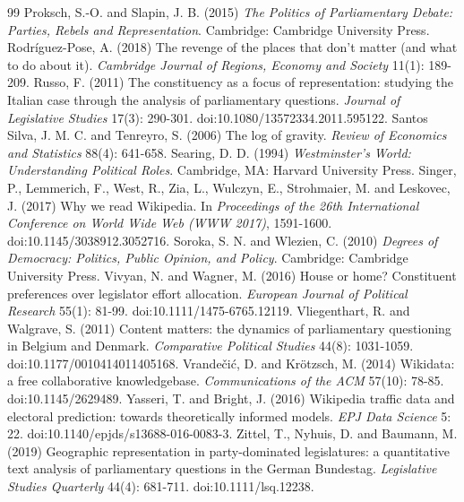 \documentclass[11pt,a4paper]{article}
\begin{document}
\begin{thebibliography}{99}
 Proksch, S.-O. and Slapin, J. B. (2015) \emph{The Politics of Parliamentary Debate: Parties, Rebels and Representation}. Cambridge: Cambridge University Press.
 Rodr\'iguez-Pose, A. (2018) The revenge of the places that don't matter (and what to do about it). \emph{Cambridge Journal of Regions, Economy and Society} 11(1): 189-209.
 Russo, F. (2011) The constituency as a focus of representation: studying the Italian case through the analysis of parliamentary questions. \emph{Journal of Legislative Studies} 17(3): 290-301. doi:10.1080/13572334.2011.595122.
 Santos Silva, J. M. C. and Tenreyro, S. (2006) The log of gravity. \emph{Review of Economics and Statistics} 88(4): 641-658.
 Searing, D. D. (1994) \emph{Westminster's World: Understanding Political Roles}. Cambridge, MA: Harvard University Press.
 Singer, P., Lemmerich, F., West, R., Zia, L., Wulczyn, E., Strohmaier, M. and Leskovec, J. (2017) Why we read Wikipedia. In \emph{Proceedings of the 26th International Conference on World Wide Web (WWW 2017)}, 1591-1600. doi:10.1145/3038912.3052716.
 Soroka, S. N. and Wlezien, C. (2010) \emph{Degrees of Democracy: Politics, Public Opinion, and Policy}. Cambridge: Cambridge University Press.
 Vivyan, N. and Wagner, M. (2016) House or home? Constituent preferences over legislator effort allocation. \emph{European Journal of Political Research} 55(1): 81-99. doi:10.1111/1475-6765.12119.
 Vliegenthart, R. and Walgrave, S. (2011) Content matters: the dynamics of parliamentary questioning in Belgium and Denmark. \emph{Comparative Political Studies} 44(8): 1031-1059. doi:10.1177/0010414011405168.
 Vrande\v{c}i\'c, D. and Kr\"otzsch, M. (2014) Wikidata: a free collaborative knowledgebase. \emph{Communications of the ACM} 57(10): 78-85. doi:10.1145/2629489.
 Yasseri, T. and Bright, J. (2016) Wikipedia traffic data and electoral prediction: towards theoretically informed models. \emph{EPJ Data Science} 5: 22. doi:10.1140/epjds/s13688-016-0083-3.
 Zittel, T., Nyhuis, D. and Baumann, M. (2019) Geographic representation in party-dominated legislatures: a quantitative text analysis of parliamentary questions in the German Bundestag. \emph{Legislative Studies Quarterly} 44(4): 681-711. doi:10.1111/lsq.12238.
\end{thebibliography}
\end{document}

